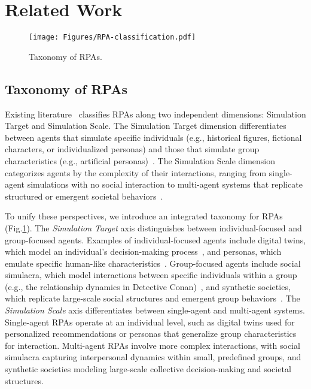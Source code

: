 \section{Related Work}

\begin{figure}[t]
    \centering
    \texttt{[image: Figures/RPA-classification.pdf]}
    \vspace{-0.5em}
    \caption{Taxonomy of RPAs.}
    \vspace{-1.5em}
    \label{fig:rpa-taxonomy}
\end{figure}

\subsection{Taxonomy of RPAs}
Existing literature~\cite{chen2024from,tseng-etal-2024-two,chen2024oscars,mou2024individual} classifies RPAs along two independent dimensions: Simulation Target and Simulation Scale. The Simulation Target dimension differentiates between agents that simulate specific individuals (e.g., historical figures, fictional characters, or individualized personas) and those that simulate group characteristics (e.g., artificial personas)~\cite{chen2024from,tseng-etal-2024-two,chen2024oscars}. The Simulation Scale dimension categorizes agents by the complexity of their interactions, ranging from single-agent simulations with no social interaction to multi-agent systems that replicate structured or emergent societal behaviors~\cite{mou2024individual}.

To unify these perspectives, we introduce an integrated taxonomy for RPAs (Fig.\ref{fig:rpa-taxonomy}). The \textit{Simulation Target} axis distinguishes between individual-focused and group-focused agents. Examples of individual-focused agents include digital twins, which model an individual's decision-making process~\cite{rossetti2024social}, and personas, which emulate specific human-like characteristics~\cite{10.1145/3613904.3642363}. Group-focused agents include social simulacra, which model interactions between specific individuals within a group (e.g., the relationship dynamics in Detective Conan)~\cite{wu2024role}, and synthetic societies, which replicate large-scale social structures and emergent group behaviors~\cite{park2023generative}. The \textit{Simulation Scale} axis differentiates between single-agent and multi-agent systems. Single-agent RPAs operate at an individual level, such as digital twins used for personalized recommendations or personas that generalize group characteristics for interaction. Multi-agent RPAs involve more complex interactions, with social simulacra capturing interpersonal dynamics within small, predefined groups, and synthetic societies modeling large-scale collective decision-making and societal structures.


